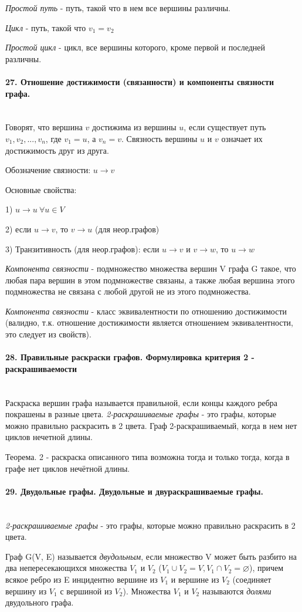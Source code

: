 \documentclass[a4paper, 12pt]{article}
\newcommand{\parag}[1]{\paragraph{#1}\mbox{}\\}
\begin{document}
\noindent
\textit{Простой путь} - путь, такой что в нем все вершины различны.

\noindent
\textit{Цикл} - путь, такой что $v_{1} = v_{2}$

\noindent
\textit{Простой цикл} - цикл, все вершины которого, кроме первой и последней различны.

\parag{27. Отношение достижимости (связанности) и компоненты связности графа.}
Говорят, что вершина $v$ достижима из вершины $u$, если существует путь $v_{1}, v_{2}, ..., v_{n}$, где $v_{1} = u$, а $v_{n} = v$.
Связность вершины $u$ и $v$ означает их достижимость друг из друга.

\noindent
Обозначение связности: $u \rightarrow v$

\noindent
Основные свойства:

1) $u \rightarrow u\ \forall u \in V$

2) если $u \rightarrow v$, то $v \rightarrow u$ (для неор.графов)

3) Транзитивность (для неор.графов): если  $u \rightarrow v$ и  $v \rightarrow w$, то  $u \rightarrow w$

\noindent
\textit{Компонента связности} - подмножество множества вершин V графа G такое, что любая пара вершин в этом подмножестве связаны, а также любая вершина этого подмножества не связана с любой другой не из этого подмножества.

\noindent
\textit{Компонента связности} - класс эквивалентности по отношению достижимости (валидно, т.к. отношение достижимости является отношением эквивалентности, это следует из свойств).

\parag{28. Правильные раскраски графов. Формулировка критерия 2 - раскрашиваемости}
Раскраска вершин графа называется правильной, если концы каждого ребра покрашены в разные цвета. \textit{2-раскрашиваемые графы} - это графы, которые можно правильно раскрасить в 2 цвета. Граф 2-раскрашиваемый, когда в нем нет циклов нечетной длины. 

\noindent
Теорема. 2 - раскраска описанного типа возможна тогда и только тогда, когда в графе нет циклов нечётной длины.

\parag{29. Двудольные графы. Двудольные и двураскрашиваемые графы.}
\textit{2-раскрашиваемые графы} - это графы, которые можно правильно раскрасить в 2 цвета.

\noindent
Граф G(V, E) называется \textit{двудольным}, если множество V может быть разбито на два непересекающихся множества $V_{1}$ и $V_{2}$ ($V_{1} \cup V_{2} = V, V_{1} \cap V_{2} = \varnothing$), причем всякое ребро из E инцидентно вершине из $V_{1}$ и вершине из $V_{2}$ (соединяет вершину из $V_{1}$ с вершиной из $V_{2}$). Множества $V_{1}$ и $V_{2}$ называются \textit{долями} двудольного графа.
\end{document}
